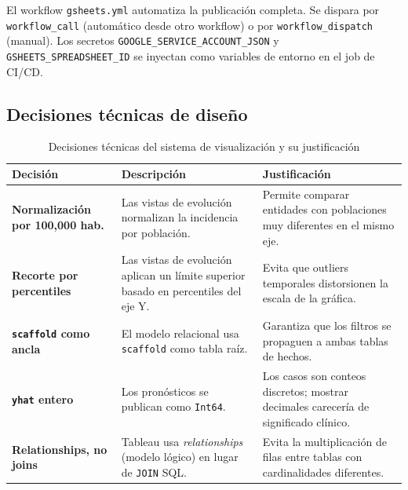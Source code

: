 \documentclass[12pt, letterpaper]{article}
\begin{document}
El workflow \texttt{gsheets.yml} automatiza la publicación completa. Se dispara por \texttt{workflow\_call} (automático desde otro workflow) o por \texttt{workflow\_dispatch} (manual). Los secretos \texttt{GOOGLE\_SERVICE\_ACCOUNT\_JSON} y \texttt{GSHEETS\_SPREADSHEET\_ID} se inyectan como variables de entorno en el job de CI/CD.

\subsection{Decisiones técnicas de diseño}\label{subsec:decisiones_tableau}

\begin{table}[H]
\centering
\caption{Decisiones técnicas del sistema de visualización y su justificación}
\label{tab:decisiones_tableau}
\scriptsize
\setlength{\tabcolsep}{4pt}
\begin{tabularx}{\textwidth}{>{\bfseries}p{3.2cm} X X}
\toprule
\textbf{Decisión} & \textbf{Descripción} & \textbf{Justificación} \\
\midrule
Normalización por 100,000 hab. & Las vistas de evolución normalizan la incidencia por población. & Permite comparar entidades con poblaciones muy diferentes en el mismo eje. \\
\addlinespace
Recorte por percentiles & Las vistas de evolución aplican un límite superior basado en percentiles del eje Y. & Evita que outliers temporales distorsionen la escala de la gráfica. \\
\addlinespace
\texttt{scaffold} como ancla & El modelo relacional usa \texttt{scaffold} como tabla raíz. & Garantiza que los filtros se propaguen a ambas tablas de hechos. \\
\addlinespace
\texttt{yhat} entero & Los pronósticos se publican como \texttt{Int64}. & Los casos son conteos discretos; mostrar decimales carecería de significado clínico. \\
\addlinespace
Relationships, no joins & Tableau usa \textit{relationships} (modelo lógico) en lugar de \texttt{JOIN} SQL. & Evita la multiplicación de filas entre tablas con cardinalidades diferentes. \\
\bottomrule
\end{tabularx}
\end{table}

\newpage

\end{document}
